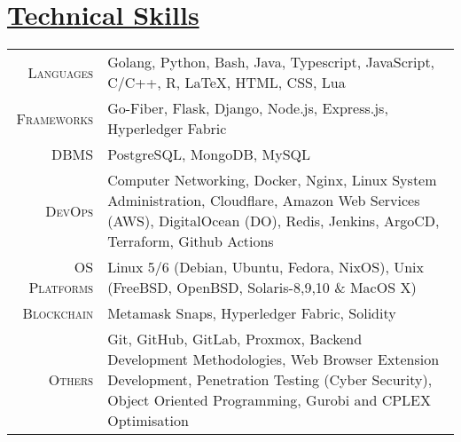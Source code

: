 \documentclass[a4paper,10pt]{extarticle} %
\begin{document}
 \vspace{+0.4cm} \section{\textcolor{primary}{\href{https://www.github.com/proffapt/bodhitree}{Technical Skills}}}

 \vspace{+0.2cm}

 \begin{tabular}{r|p{15cm}}
 \textsc{Languages} & Golang, Python, Bash, Java, Typescript, JavaScript, C/C++, R, LaTeX, HTML, CSS, Lua\\
 \textsc{Frameworks} & Go-Fiber, Flask, Django, Node.js, Express.js, Hyperledger Fabric \\
 \textsc{DBMS} & PostgreSQL, MongoDB, MySQL \\
 \textsc{DevOps} & Computer Networking, Docker, Nginx, Linux System Administration, Cloudflare, Amazon Web Services (AWS), DigitalOcean (DO), Redis, Jenkins, ArgoCD, Terraform, Github Actions \\
 \textsc{OS Platforms} & Linux 5/6 (Debian, Ubuntu, Fedora, NixOS), Unix (FreeBSD, OpenBSD, Solaris-8,9,10 \& MacOS X) \\
 \textsc{Blockchain} & Metamask Snaps, Hyperledger Fabric, Solidity \\
 \textsc{Others} & Git, GitHub, GitLab, Proxmox, Backend Development Methodologies, Web Browser Extension Development, Penetration Testing (Cyber Security), Object Oriented Programming, Gurobi and CPLEX Optimisation \\
 
 
\end{tabular}



\end{document}
